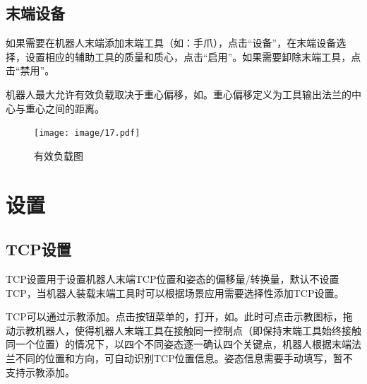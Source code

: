 \subsection{末端设备}
\label{sec:末端设备}
如果需要在机器人末端添加末端工具（如：手爪），点击“设备”，在末端设备选择，设置相应的辅助工具的质量和质心，点击“启用”。如果需要卸除末端工具，点击“禁用”。

机器人最大允许有效负载取决于重心偏移，如。重心偏移定义为工具输出法兰的中心与重心之间的距离。

\begin{figure}[ht]
	\centering
	\texttt{[image: image/17.pdf]}
	\caption{有效负载图}
	\label{fig:有效负载图}
\end{figure}


\section{设置}
\subsection{TCP设置}
TCP设置用于设置机器人末端TCP位置和姿态的偏移量/转换量，默认不设置TCP，当机器人装载末端工具时可以根据场景应用需要选择性添加TCP设置。

TCP可以通过示教添加。点击按钮菜单的，打开，如。此时可点击示教图标，拖动示教机器人，使得机器人末端工具在接触同一控制点（即保持末端工具始终接触同一个位置）的情况下，以四个不同姿态逐一确认四个关键点，机器人根据末端法兰不同的位置和方向，可自动识别TCP位置信息。姿态信息需要手动填写，暂不支持示教添加。

